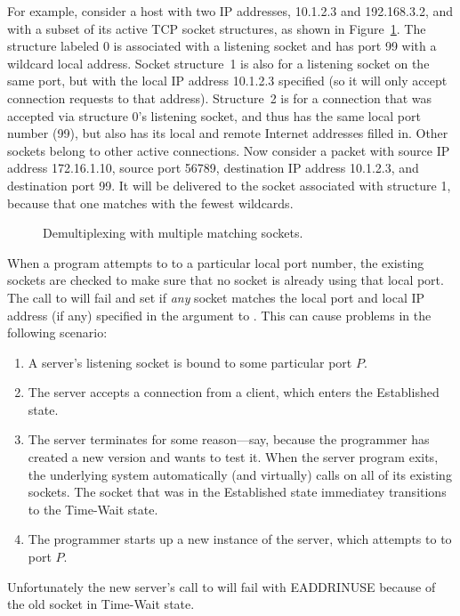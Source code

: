 For example, consider a host with two IP addresses, 10.1.2.3 and
192.168.3.2, and with a subset of its active TCP socket structures, as
shown in Figure~\ref{demuxex}.  The structure labeled 0 is associated
with a listening socket and has port 99
with a wildcard local address.  Socket structure~1 is also for a
listening socket on the same port, but
with the local IP address 10.1.2.3 specified (so it will only accept
connection requests to that address).  Structure~2 is for a connection
that was accepted via structure 0's listening socket, and
thus has the same local port number (99), but also has its local and remote
Internet addresses filled in.  Other sockets belong to other active
connections.  Now consider a packet with source IP address
172.16.1.10, source port 56789, destination IP address 10.1.2.3, and
destination port 99.  It will be delivered to the socket associated
with structure 1, because that one matches with the fewest wildcards.

\begin{figure}
\caption{\label{demuxex}Demultiplexing with multiple matching sockets.}
\end{figure}

When a program attempts to  to a particular local port
number, the existing sockets are checked to make sure that no socket
is already using that local port.  The call to  will fail
and set   if \emph{any} socket matches the local
port and local IP address (if any) specified in the argument to .
This can cause problems in the following scenario:
%
\begin{enumerate}

\item A server's listening socket is bound to some particular port
  $P$.

\item The server accepts a connection from a client, which enters the
  Established state.

\item The server terminates for some reason---say, because the
  programmer has created a new version and wants to test it.
  When the server program exits,
  the underlying system automatically (and virtually) calls
  on  all of its existing sockets.  The socket that was
  in the Established state immediatey  transitions to the Time-Wait state.

\item
The programmer starts up a new instance of the server, which attempts
to  to port $P$.
\end{enumerate}
Unfortunately the new server's call to  will fail with
EADDRINUSE because of the old socket in Time-Wait state.

